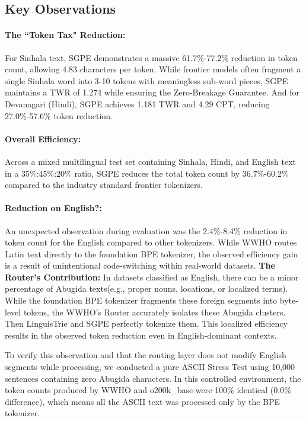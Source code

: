 \subsection{Key Observations}
\paragraph{The ``Token Tax" Reduction:} For Sinhala text, SGPE demonstrates a massive 61.7\%-77.2\% reduction in token count, allowing 4.83 characters per token. While frontier models often fragment a single Sinhala word into 3-10 tokens with meaningless sub-word pieces, SGPE maintains a TWR of 1.274 while ensuring the Zero-Breakage Guarantee. And for Devanagari (Hindi), SGPE achieves 1.181 TWR and 4.29 CPT, reducing 27.0\%-57.6\% token reduction.

\paragraph{Overall Efficiency:} Across a mixed multilingual test set containing Sinhala, Hindi, and English text in a 35\%:45\%:20\% ratio, SGPE reduces the total token count by 36.7\%-60.2\% compared to the industry standard frontier tokenizers.

\paragraph{Reduction on English?:}
An unexpected observation during evaluation was the 2.4\%-8.4\% reduction in token count for the English compared to other tokenizers. While WWHO routes Latin text directly to the foundation BPE tokenizer, the observed efficiency gain is a result of unintentional code-switching within real-world datasets.
\textbf{The Router's Contribution:} In datasets classified as English, there can be a minor percentage of Abugida texts(e.g., proper nouns, locations, or localized terms). While the foundation BPE tokenizer fragments these foreign segments into byte-level tokens, the WWHO's Router accurately isolates these Abugida clusters. Then LinguisTrie and SGPE perfectly tokenize them. This localized efficiency results in the observed token reduction even in English-dominant contexts. 

To verify this observation and that the routing layer does not modify English segments while processing, we conducted a pure ASCII Stress Test using 10,000 sentences containing zero Abugida characters. In this controlled environment, the token counts produced by WWHO and o200k\_base were 100\% identical (0.0\% difference), which means all the ASCII text was processed only by the BPE tokenizer.

